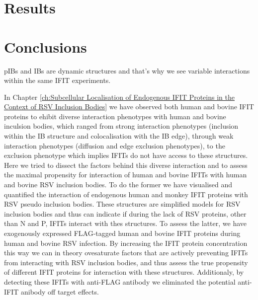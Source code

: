 \section{Results} \label{sec:Results-Chapter4}



\section{Conclusions} \label{sec:Conclusions-Chapter4}
pIBs and IBs are dynamic structures and that's why we see variable interactions within the same IFIT experiments.

In Chapter \ref{ch:Subcellular Localisation of Endogenous IFIT Proteins in the Context of RSV Inclusion Bodies} we have observed both human and bovine IFIT proteins to ehibit diverse interaction phenotypes with human and bovine inculsion bodies, which ranged from strong interaction phenotypes (inclusion within the IB structure and colocalisation with the IB edge), through weak interaction phenotypes (diffusion and edge exclusion phenotypes), to the exclusion phenotype which implies IFITs do not have access to these structures. Here we tried to dissect the factors behind this diverse interaction and to assess the maximal propensity for interaction of human and bovine IFITs with human and bovine RSV inclusion bodies. To do the former we have visualised and quantified the interaction of endogenous human and monkey IFIT proteins with RSV pseudo inclusion bodies. These structures are simplified models for RSV inclusion bodies and thus can indicate if during the lack of RSV proteins, other than N and P, IFITs interact with thes structures. To assess the latter, we have exogenously expressed FLAG-tagged human and bovine IFIT proteins during human and bovine RSV infection. By increasing the IFIT protein concentration this way we can in theory ovesaturate factors that are actively preventing IFITs from interacting with RSV inclusion bodies, and thus assess the true propensity of different IFIT proteins for interaction with these structures. Additionaly, by detecting these IFITs with anti-FLAG antibody we eliminated the potential anti-IFIT anibody off target effects.

